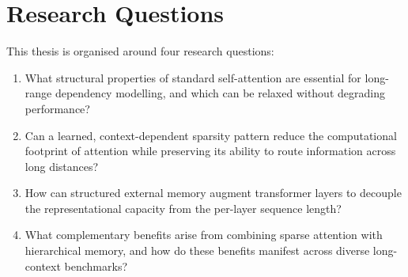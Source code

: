 \section{Research Questions}

This thesis is organised around four research questions:

\begin{enumerate}[label=\textbf{RQ\arabic*}, leftmargin=3em]
  \item What structural properties of standard self-attention are essential for long-range
    dependency modelling, and which can be relaxed without degrading performance?
  \item Can a learned, context-dependent sparsity pattern reduce the computational footprint
    of attention while preserving its ability to route information across long distances?
  \item How can structured external memory augment transformer layers to decouple the
    representational capacity from the per-layer sequence length?
  \item What complementary benefits arise from combining sparse attention with hierarchical
    memory, and how do these benefits manifest across diverse long-context benchmarks?
\end{enumerate}

